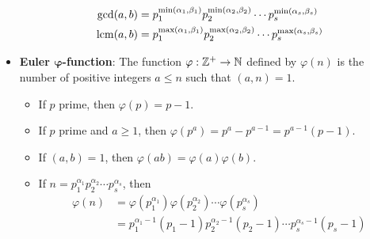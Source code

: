 \documentclass[../notes.tex]{subfiles}
\begin{document}
\begin{itemize}
    \begin{align*}
        \gcd(a,b) &= p_1^{\min(\alpha_1,\beta_1)}p_2^{\min(\alpha_2,\beta_2)}\cdots p_s^{\min(\alpha_s,\beta_s)}\\
        \operatorname{lcm}(a,b) &= p_1^{\max(\alpha_1,\beta_1)}p_2^{\max(\alpha_2,\beta_2)}\cdots p_s^{\max(\alpha_s,\beta_s)}
    \end{align*}
    \item \textbf{Euler $\bm{\varphi}$-function}: The function $\varphi:\mathbb{Z}^+\to\mathbb{N}$ defined by $\varphi(n)$ is the number of positive integers $a\leq n$ such that $(a,n)=1$.
    \begin{itemize}
        \item If $p$ prime, then $\varphi(p)=p-1$.
        \item If $p$ prime and $a\geq 1$, then $\varphi(p^a)=p^a-p^{a-1}=p^{a-1}(p-1)$.
        \item If $(a,b)=1$, then $\varphi(ab)=\varphi(a)\varphi(b)$.
        \item If $n=p_1^{\alpha_1}p_2^{\alpha_2}\cdots p_s^{\alpha_s}$, then
        \begin{align*}
            \varphi(n) &= \varphi(p_1^{\alpha_1})\varphi(p_2^{\alpha_2})\cdots\varphi(p_s^{\alpha_s})\\
            &= p_1^{\alpha_1-1}(p_1-1)p_2^{\alpha_2-1}(p_2-1)\cdots p_s^{\alpha_s-1}(p_s-1)
        \end{align*}
    \end{itemize}
\end{itemize}
\end{document}
